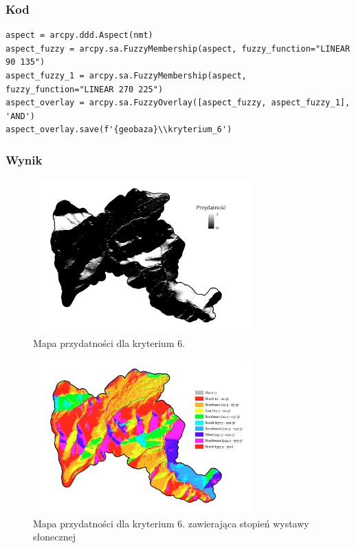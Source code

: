 \documentclass{article}
\begin{document}
\subsubsection{Kod}
\begin{lstlisting}
aspect = arcpy.ddd.Aspect(nmt)
aspect_fuzzy = arcpy.sa.FuzzyMembership(aspect, fuzzy_function="LINEAR 90 135")
aspect_fuzzy_1 = arcpy.sa.FuzzyMembership(aspect, fuzzy_function="LINEAR 270 225")
aspect_overlay = arcpy.sa.FuzzyOverlay([aspect_fuzzy, aspect_fuzzy_1], 'AND')
aspect_overlay.save(f'{geobaza}\\kryterium_6')
\end{lstlisting}

\subsubsection{Wynik}
\begin{figure}[H]
    \centering
    \includegraphics[width=0.75\textwidth]{img/kryterium6-layout.jpg}
    \caption*{Mapa przydatności dla kryterium 6.}
\end{figure}

\begin{figure}[H]
    \centering
    \includegraphics[width=0.75\textwidth]{img/kryterium6-aspect.jpg}
    \caption*{Mapa przydatności dla kryterium 6. zawierająca stopień wystawy słonecznej}
\end{figure}
\end{document}
